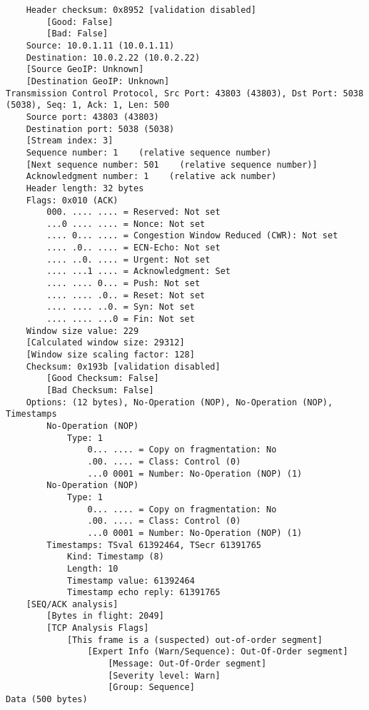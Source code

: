 \begin{lstlisting}
    Header checksum: 0x8952 [validation disabled]
        [Good: False]
        [Bad: False]
    Source: 10.0.1.11 (10.0.1.11)
    Destination: 10.0.2.22 (10.0.2.22)
    [Source GeoIP: Unknown]
    [Destination GeoIP: Unknown]
Transmission Control Protocol, Src Port: 43803 (43803), Dst Port: 5038 (5038), Seq: 1, Ack: 1, Len: 500
    Source port: 43803 (43803)
    Destination port: 5038 (5038)
    [Stream index: 3]
    Sequence number: 1    (relative sequence number)
    [Next sequence number: 501    (relative sequence number)]
    Acknowledgment number: 1    (relative ack number)
    Header length: 32 bytes
    Flags: 0x010 (ACK)
        000. .... .... = Reserved: Not set
        ...0 .... .... = Nonce: Not set
        .... 0... .... = Congestion Window Reduced (CWR): Not set
        .... .0.. .... = ECN-Echo: Not set
        .... ..0. .... = Urgent: Not set
        .... ...1 .... = Acknowledgment: Set
        .... .... 0... = Push: Not set
        .... .... .0.. = Reset: Not set
        .... .... ..0. = Syn: Not set
        .... .... ...0 = Fin: Not set
    Window size value: 229
    [Calculated window size: 29312]
    [Window size scaling factor: 128]
    Checksum: 0x193b [validation disabled]
        [Good Checksum: False]
        [Bad Checksum: False]
    Options: (12 bytes), No-Operation (NOP), No-Operation (NOP), Timestamps
        No-Operation (NOP)
            Type: 1
                0... .... = Copy on fragmentation: No
                .00. .... = Class: Control (0)
                ...0 0001 = Number: No-Operation (NOP) (1)
        No-Operation (NOP)
            Type: 1
                0... .... = Copy on fragmentation: No
                .00. .... = Class: Control (0)
                ...0 0001 = Number: No-Operation (NOP) (1)
        Timestamps: TSval 61392464, TSecr 61391765
            Kind: Timestamp (8)
            Length: 10
            Timestamp value: 61392464
            Timestamp echo reply: 61391765
    [SEQ/ACK analysis]
        [Bytes in flight: 2049]
        [TCP Analysis Flags]
            [This frame is a (suspected) out-of-order segment]
                [Expert Info (Warn/Sequence): Out-Of-Order segment]
                    [Message: Out-Of-Order segment]
                    [Severity level: Warn]
                    [Group: Sequence]
Data (500 bytes)


\end{lstlisting}
